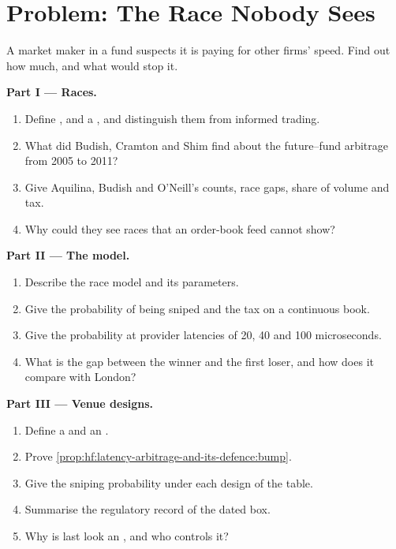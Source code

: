 \section{Problem: The Race Nobody Sees}

\begin{problem}\label{pb:hf:latency-arbitrage-and-its-defence:1}
A market maker in a fund suspects it is paying for other firms' speed. Find out how much, and what would stop it.

\medskip\noindent\textbf{Part I --- Races.}
\begin{enumerate}
\item Define ,  and a , and distinguish them
from informed trading.
\item What did Budish, Cramton and Shim find about the future--fund arbitrage from 2005 to 2011?
\item Give Aquilina, Budish and O'Neill's counts, race gaps, share of volume and tax.
\item Why could they see races that an order-book feed cannot show?
\end{enumerate}

\medskip\noindent\textbf{Part II --- The model.}
\begin{enumerate}[resume]
\item Describe the race model and its parameters.
\item Give the probability of being sniped and the tax on a continuous book.
\item Give the probability at provider latencies of 20, 40 and 100 microseconds.
\item What is the gap between the winner and the first loser, and how does it compare with London?
\end{enumerate}

\medskip\noindent\textbf{Part III --- Venue designs.}
\begin{enumerate}[resume]
\item Define a  and an .
\item Prove \cref{prop:hf:latency-arbitrage-and-its-defence:bump}.
\item Give the sniping probability under each design of the table.
\item Summarise the regulatory record of the dated box.
\item Why is last look an , and who controls it?
\end{enumerate}


\end{problem}
